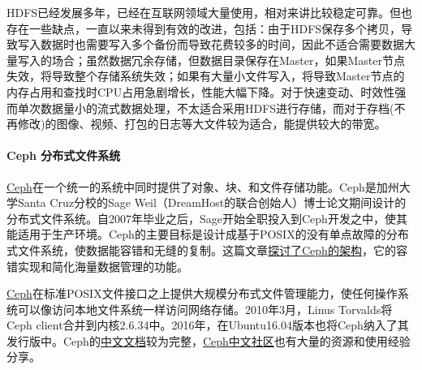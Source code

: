 \documentclass[letterpaper,10pt,english]{sphinxmanual}
\begin{document}
HDFS已经发展多年，已经在互联网领域大量使用，相对来讲比较稳定可靠。但也存在一些缺点，一直以来未得到有效的改进，包括：由于HDFS保存多个拷贝，导致写入数据时也需要写入多个备份而导致花费较多的时间，因此不适合需要数据大量写入的场合；虽然数据冗余存储，但数据目录保存在Master，如果Master节点失效，将导致整个存储系统失效；如果有大量小文件写入，将导致Master节点的内存占用和查找时CPU占用急剧增长，性能大幅下降。对于快速变动、时效性强而单次数据量小的流式数据处理，不太适合采用HDFS进行存储，而对于存档(不再修改)的图像、视频、打包的日志等大文件较为适合，能提供较大的带宽。


\paragraph{Ceph 分布式文件系统}
\label{gispark_cloud:Ceph-_u5206_u5e03_u5f0f_u6587_u4ef6_u7cfb_u7edf}
\href{http://ceph.com/}{Ceph}在一个统一的系统中同时提供了对象、块、和文件存储功能。Ceph是加州大学Santa
Cruz分校的Sage
Weil（DreamHost的联合创始人）博士论文期间设计的分布式文件系统。自2007年毕业之后，Sage开始全职投入到Ceph开发之中，使其能适用于生产环境。Ceph的主要目标是设计成基于POSIX的没有单点故障的分布式文件系统，使数据能容错和无缝的复制。这篇文章\href{http://www.oschina.net/translate/ceph}{探讨了Ceph的架构}，它的容错实现和简化海量数据管理的功能。

\href{http://ceph.com/}{Ceph}在标准POSIX文件接口之上提供大规模分布式文件管理能力，使任何操作系统可以像访问本地文件系统一样访问网络存储。2010年3月，Linus
Torvalds将Ceph
client合并到内核2.6.34中。2016年，在Ubuntu16.04版本也将Ceph纳入了其发行版中。Ceph的\href{http://docs.ceph.org.cn/}{中文文档}较为完整，\href{http://www.ceph.org.cn}{Ceph中文社区}也有大量的资源和使用经验分享。
\end{document}
